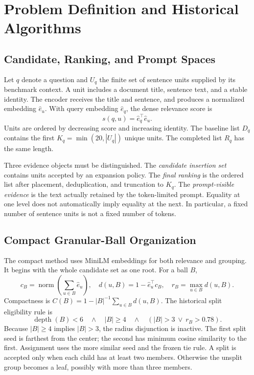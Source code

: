 \documentclass[11pt,a4paper]{article}
\begin{document}
\section{Problem Definition and Historical Algorithms}
\subsection{Candidate, Ranking, and Prompt Spaces}
Let $q$ denote a question and $U_q$ the finite set of sentence units supplied
by its benchmark context. A unit includes a document title, sentence text,
and a stable identity. The encoder receives the title and sentence, and
produces a normalized embedding $\hat e_u$. With query embedding $\hat e_q$,
the dense relevance score is
\begin{equation}
s(q,u)=\hat e_q^\top\hat e_u.
\end{equation}
Units are ordered by decreasing score and increasing identity. The baseline
list $D_q$ contains the first $K_q=\min(20,|U_q|)$ unique units.
The completed list $R_q$ has the same length.

Three evidence objects must be distinguished. The \emph{candidate insertion
set} contains units accepted by an expansion policy. The \emph{final ranking}
is the ordered list after placement, deduplication, and truncation to $K_q$.
The \emph{prompt-visible evidence} is the text actually retained by the
token-limited prompt. Equality at one level does not automatically imply
equality at the next. In particular, a fixed number of sentence units is not
a fixed number of tokens.

\subsection{Compact Granular-Ball Organization}
The compact method uses MiniLM embeddings for both relevance and grouping.
It begins with the whole candidate set as one root. For a ball $B$,
\begin{equation}
c_B=\operatorname{norm}\left(\sum_{u\in B}\hat e_u\right),\quad
d(u,B)=1-\hat e_u^\top c_B,\quad r_B=\max_{u\in B}d(u,B).
\end{equation}
Compactness is $C(B)=1-|B|^{-1}\sum_{u\in B}d(u,B)$.
The historical split eligibility rule is
\begin{equation}
\operatorname{depth}(B)<6\quad\land\quad |B|\geq4
\quad\land\quad (|B|>3\ \lor\ r_B>0.78).
\label{eq:split}
\end{equation}
Because $|B|\geq4$ implies $|B|>3$, the radius disjunction is inactive.
The first split seed is farthest from the center; the second has minimum
cosine similarity to the first. Assignment uses the more similar seed and
the frozen tie rule. A split is accepted only when each child has at least
two members. Otherwise the unsplit group becomes a leaf, possibly with more
than three members.
\end{document}
